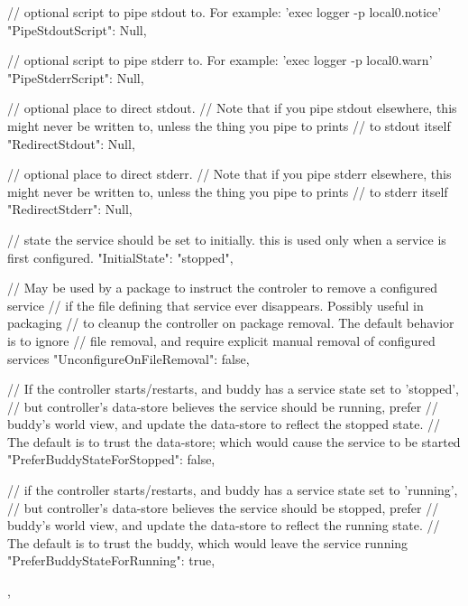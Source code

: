 \begin{DoxyVerb}
{{        // optional script to pipe stdout to. For example: 'exec logger -p local0.notice'
        "PipeStdoutScript": Null,

        // optional script to pipe stderr to. For example: 'exec logger -p local0.warn'
        "PipeStderrScript": Null,

        // optional place to direct stdout.
        // Note that if you pipe stdout elsewhere, this might never be written to, unless the thing you pipe to prints
        // to stdout itself
        "RedirectStdout": Null,

        // optional place to direct stderr.
        // Note that if you pipe stderr elsewhere, this might never be written to, unless the thing you pipe to prints
        // to stderr itself
        "RedirectStderr": Null,

        // state the service should be set to initially. this is used only when a service is first configured.
        "InitialState": "stopped",

        // May be used by a package to instruct the controler to remove a configured service
        // if the file defining that service ever disappears. Possibly useful in packaging
        // to cleanup the controller on package removal. The default behavior is to ignore
        // file removal, and require explicit manual removal of configured services
        "UnconfigureOnFileRemoval": false,

        // If the controller starts/restarts, and buddy has a service state set to 'stopped',
        // but controller's data-store believes the service should be running, prefer
        // buddy's world view, and update the data-store to reflect the stopped state.
        // The default is to trust the data-store; which would cause the service to be started
        "PreferBuddyStateForStopped": false,

        // if the controller starts/restarts, and buddy has a service state set to 'running',
        // but controller's data-store believes the service should be stopped, prefer
        // buddy's world view, and update the data-store to reflect the running state.
        // The default is to trust the buddy, which would leave the service running
        "PreferBuddyStateForRunning": true,
    },
}
\end{DoxyVerb}
 